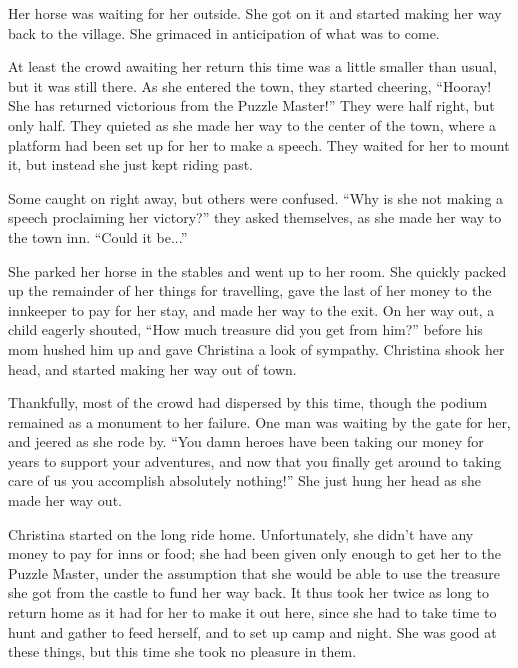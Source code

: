 \documentclass[showtrims,b6paper,draft,10pt]{memoir}
\begin{document}
Her horse was waiting for her outside.  She got on it and started making her way back to the village.  She grimaced in anticipation of what was to come.

\timeskip

At least the crowd awaiting her return this time was a little smaller than usual, but it was still there.  As she entered the town, they started cheering, ``Hooray!  She has returned victorious from the Puzzle Master!''    They were half right, but only half.  They quieted as she made her way to the center of the town, where a platform had been set up for her to make a speech.  They waited for her to mount it, but instead she just kept riding past.

Some caught on right away, but others were confused.  ``Why is she not making a speech proclaiming her victory?'' they asked themselves, as she made her way to the town inn.  ``Could it be...''

She parked her horse in the stables and went up to her room.  She quickly packed up the remainder of her things for travelling, gave the last of her money to the innkeeper to pay for her stay, and made her way to the exit.  On her way out, a child eagerly shouted, ``How much treasure did you get from him?'' before his mom hushed him up and gave Christina a look of sympathy.  Christina shook her head, and started making her way out of town.

Thankfully, most of the crowd had dispersed by this time, though the podium remained as a monument to her failure.  One man was waiting by the gate for her, and jeered as she rode by. ``You damn heroes have been taking our money for years to support your adventures, and now that you finally get around to taking care of us you accomplish absolutely nothing!''  She just hung her head as she made her way out.

\timeskip
Christina started on the long ride home.  Unfortunately, she didn't have any money to pay for inns or food;  she had been given only enough to get her to the Puzzle Master, under the assumption that she would be able to use the treasure she got from the castle to fund her way back.  It thus took her twice as long to return home as it had for her to make it out here, since she had to take time to hunt and gather to feed herself, and to set up camp and night.  She was good at these things, but this time she took no pleasure in them.
\end{document}
